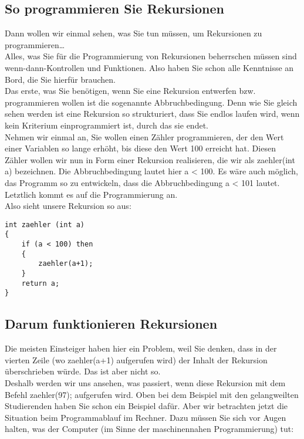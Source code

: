 \subsection{So programmieren Sie Rekursionen}

Dann wollen wir einmal sehen, was Sie tun müssen, um Rekursionen zu programmieren…\\

Alles, was Sie für die Programmierung von Rekursionen beherrschen müssen sind wenn-dann-Kontrollen und Funktionen. Also haben Sie schon alle Kenntnisse an Bord, die Sie hierfür brauchen.\\

Das erste, was Sie benötigen, wenn Sie eine Rekursion entwerfen bzw. programmieren wollen ist die sogenannte Abbruchbedingung. Denn wie Sie gleich sehen werden ist eine Rekursion so strukturiert, dass Sie endlos laufen wird, wenn kein Kriterium einprogrammiert ist, durch das sie endet.\\

Nehmen wir einmal an, Sie wollen einen Zähler programmieren, der den Wert einer Variablen so lange erhöht, bis diese den Wert 100 erreicht hat. Diesen Zähler wollen wir nun in Form einer Rekursion realisieren, die wir als zaehler(int a) bezeichnen.
Die Abbruchbedingung lautet hier a < 100. Es wäre auch möglich, das Programm so zu entwickeln, dass die Abbruchbedingung a < 101 lautet. Letztlich kommt es auf die Programmierung an.\\

Also sieht unsere Rekursion so aus:

\begin{verbatim}
int zaehler (int a)
{ 
	if (a < 100) then
	{ 
		zaehler(a+1); 
	}
	return a;
}
\end{verbatim}

\subsection{Darum funktionieren Rekursionen}

Die meisten Einsteiger haben hier ein Problem, weil Sie denken, dass in der vierten Zeile (wo zaehler(a+1) aufgerufen wird) der Inhalt der Rekursion überschrieben würde. Das ist aber nicht so.\\

Deshalb werden wir uns ansehen, was passiert, wenn diese Rekursion mit dem Befehl zaehler(97); aufgerufen wird. Oben bei dem Beispiel mit den gelangweilten Studierenden haben Sie schon ein Beispiel dafür. Aber wir betrachten jetzt die Situation beim Programmablauf im Rechner. Dazu müssen Sie sich vor Augen halten, was der Computer (im Sinne der maschinennahen Programmierung) tut:\\

